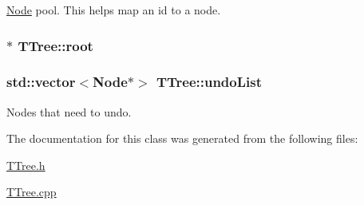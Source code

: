 \hyperlink{classTTree_1_1Node}{Node} pool. This helps map an id to a node. 

\hypertarget{classTTree_a76972bd24a6d2f940fe1645d008a4a04}{}
\subsubsection[{root}]{$\ast$ T\+Tree\+::root\hspace{0.3cm}{\ttfamily [private]}}\label{classTTree_a76972bd24a6d2f940fe1645d008a4a04}
\hypertarget{classTTree_a384e0ade54dfcb4688d646e3674e964a}{}
\subsubsection[{undo\+List}]{\setlength{\rightskip}{0pt plus 5cm}std\+::vector$<${\bf Node}$\ast$$>$ T\+Tree\+::undo\+List\hspace{0.3cm}{\ttfamily [private]}}\label{classTTree_a384e0ade54dfcb4688d646e3674e964a}


Nodes that need to undo. 



The documentation for this class was generated from the following files\+:\begin{DoxyCompactItemize}
\item 
\hyperlink{TTree_8h}{T\+Tree.\+h}\item 
\hyperlink{TTree_8cpp}{T\+Tree.\+cpp}\end{DoxyCompactItemize}
